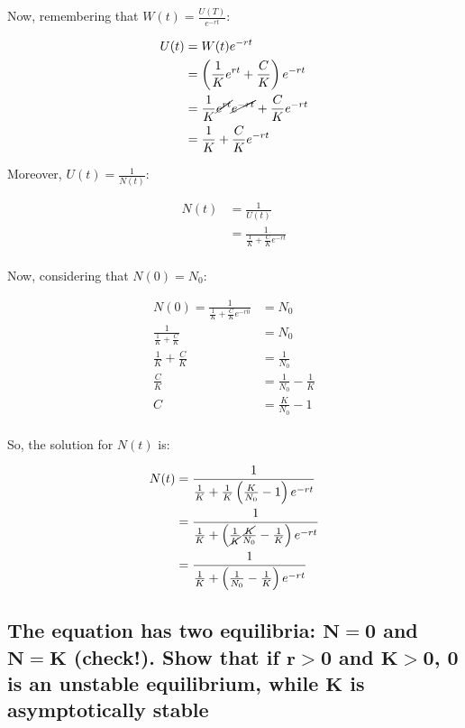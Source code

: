   Now, remembering that $W(t) = \frac{U(T)}{e^{-rt}}$:

  \begin{align*}
    U(t) &= W(t)e^{-rt}\\
         &= \left(\frac{1}{K}e^{rt} + \frac{C}{K}\right)e^{-rt}\\
         &= \frac{1}{K}\cancel{e^{rt}}\cancel{e^{-rt}}+\frac{C}{K}e^{-rt}\\
         &= \frac{1}{K}+\frac{C}{K}e^{-rt}
  \end{align*}

  Moreover, $U(t) = \frac{1}{N(t)}$:

  \begin{align*}
    N(t) &= \frac{1}{U(t)}\\
         &= \frac{1}{\frac{1}{K} + \frac{C}{K}e^{-rt}}\\
  \end{align*}

  Now, considering that $N(0) = N_0$:

  \begin{align*}
    N(0) = \frac{1}{\frac{1}{K} + \frac{C}{K}e^{-r0}} &= N_0\\
    \frac{1}{\frac{1}{K} + \frac{C}{K}} &= N_0\\
    \frac{1}{K} + \frac{C}{K} &= \frac{1}{N_0}\\
    \frac{C}{K} &= \frac{1}{N_0} - \frac{1}{K}\\
    C &= \frac{K}{N_0} - 1\\
  \end{align*}

  So, the solution for $N(t)$ is:

  \begin{align*}
    N(t) &= \frac{1}{\frac{1}{K} + \frac{1}{K}\left(\frac{K}{N_0}-1\right)e^{-rt}}\\
         &= \frac{1}{\frac{1}{K} + \left(\frac{1}{\cancel{K}}\frac{\cancel{K}}{N_0}-\frac{1}{K}\right)e^{-rt}}\\
         &= \frac{1}{\frac{1}{K} + \left(\frac{1}{N_0}-\frac{1}{K}\right)e^{-rt}}\\
  \end{align*}

  \subsection{The equation has two equilibria: $\mathbf{N = 0}$ and $\mathbf{N = K}$ (check!). Show that if $\mathbf{r > 0}$ and $\mathbf{K > 0}$, $\mathbf{0}$ is an unstable equilibrium, while $\mathbf{K}$ is asymptotically stable}

